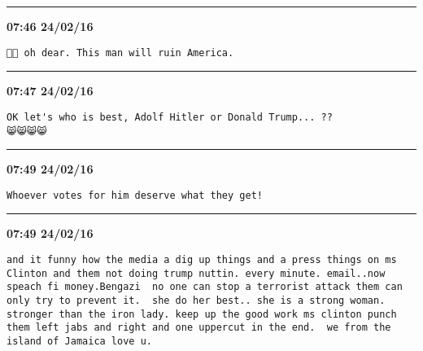 \hrule%

\begin{adjustwidth}{0cm}{0cm}
\footnotesize \textbf{07:46 24/02/16}

\begin{lstlisting}[breaklines, breakatwhitespace, basicstyle=\small, frame=leftline]
🙈🙈 oh dear. This man will ruin America.
\end{lstlisting}
\end{adjustwidth}

\hrule%

\begin{adjustwidth}{0cm}{0cm}
\footnotesize \textbf{07:47 24/02/16}

\begin{lstlisting}[breaklines, breakatwhitespace, basicstyle=\small, frame=leftline]
OK let's who is best, Adolf Hitler or Donald Trump... ?? 
😸😸😸😸
\end{lstlisting}
\end{adjustwidth}

\hrule%

\begin{adjustwidth}{0cm}{0cm}
\footnotesize \textbf{07:49 24/02/16}

\begin{lstlisting}[breaklines, breakatwhitespace, basicstyle=\small, frame=leftline]
Whoever votes for him deserve what they get!
\end{lstlisting}
\end{adjustwidth}

\hrule%

\begin{adjustwidth}{0cm}{0cm}
\footnotesize \textbf{07:49 24/02/16}

\begin{lstlisting}[breaklines, breakatwhitespace, basicstyle=\small, frame=leftline]
and it funny how the media a dig up things and a press things on ms Clinton and them not doing trump nuttin. every minute. email..now speach fi money.Bengazi  no one can stop a terrorist attack them can only try to prevent it.  she do her best.. she is a strong woman. stronger than the iron lady. keep up the good work ms clinton punch them left jabs and right and one uppercut in the end.  we from the island of Jamaica love u.
\end{lstlisting}
\end{adjustwidth}

